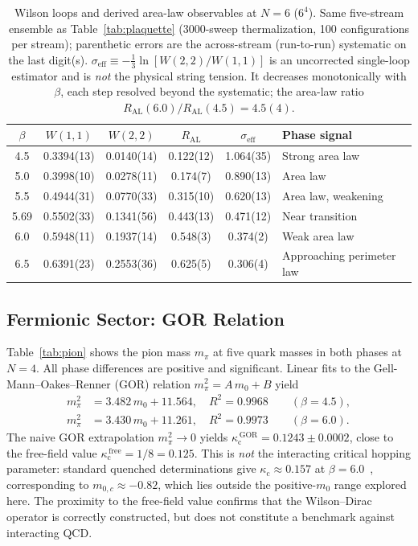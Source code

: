 \documentclass[12pt]{article}
\newcommand{\kc}{\kappa_{\mathrm{c}}}  %
\begin{document}
\begin{table}[ht]
\centering
\caption{Wilson loops and derived area-law observables at $N=6$ ($6^4$).
Same five-stream ensemble as Table~\ref{tab:plaquette} (3000-sweep
thermalization, 100 configurations per stream); parenthetic errors are the
across-stream (run-to-run) systematic on the last digit(s).
$\sigma_{\text{eff}}\equiv-\tfrac13\ln[W(2,2)/W(1,1)]$ is an uncorrected
single-loop estimator and is \emph{not} the physical string tension. It
decreases monotonically with $\beta$, each step resolved beyond the
systematic; the area-law ratio $R_{\text{AL}}(6.0)/R_{\text{AL}}(4.5)=4.5(4)$.}
\label{tab:wloop}
\begin{tabular}{@{}ccccc l@{}}
  \toprule
  $\beta$ & $W(1,1)$ & $W(2,2)$ & $R_{\text{AL}}$
    & $\sigma_{\text{eff}}$ & Phase signal \\
  \midrule
  4.5  & 0.3394(13) & 0.0140(14) & 0.122(12) & 1.064(35) & Strong area law \\
  5.0  & 0.3998(10) & 0.0278(11) & 0.174(7)  & 0.890(13) & Area law \\
  5.5  & 0.4944(31) & 0.0770(33) & 0.315(10) & 0.620(13) & Area law, weakening \\
  5.69 & 0.5502(33) & 0.1341(56) & 0.443(13) & 0.471(12) & Near transition \\
  6.0  & 0.5948(11) & 0.1937(14) & 0.548(3)  & 0.374(2)  & Weak area law \\
  6.5  & 0.6391(23) & 0.2553(36) & 0.625(5)  & 0.306(4)  & Approaching perimeter law \\
  \bottomrule
\end{tabular}
\end{table}

\subsection{Fermionic Sector: GOR Relation}
\label{sec:gor}

Table~\ref{tab:pion} shows the pion mass $m_\pi$ at five quark masses
in both phases at $N=4$.  All phase differences are positive and
significant.  Linear fits to the Gell-Mann--Oakes--Renner (GOR)
relation $m_\pi^2 = A\,m_0 + B$ yield
\begin{equation}
\begin{aligned}
  m_\pi^2 &= 3.482\,m_0 + 11.564, \quad R^2 = 0.9968
    \qquad (\beta = 4.5), \\
  m_\pi^2 &= 3.430\,m_0 + 11.261, \quad R^2 = 0.9973
    \qquad (\beta = 6.0).
\end{aligned}
\label{eq:gor-fits}
\end{equation}
The naive GOR extrapolation $m_\pi^2\to0$ yields
$\kc^{\,\text{GOR}} = 0.1243\pm0.0002$, close to the free-field value
$\kc^{\,\text{free}} = 1/8 = 0.125$.  This is \emph{not} the
interacting critical hopping parameter: standard quenched determinations
give $\kc\approx0.157$ at $\beta=6.0$~\cite{Gattringer2010}, corresponding
to $m_{0,c}\approx-0.82$, which lies outside the positive-$m_0$ range
explored here.  The proximity to the free-field value confirms that the
Wilson--Dirac operator is correctly constructed, but does not constitute
a benchmark against interacting QCD.
\end{document}
